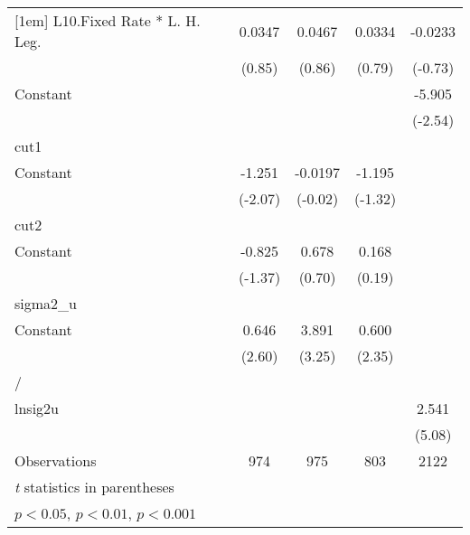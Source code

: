 {\begin{longtable}{l*{4}{c}}
[1em]
L10.Fixed Rate * L. H. Leg.&   0.0347         &   0.0467         &   0.0334         &  -0.0233         \\
                &   (0.85)         &   (0.86)         &   (0.79)         &  (-0.73)         \\
[1em]
Constant        &                  &                  &                  &   -5.905\sym{*}  \\
                &                  &                  &                  &  (-2.54)         \\
\hline
cut1            &                  &                  &                  &                  \\
Constant        &   -1.251\sym{*}  &  -0.0197         &   -1.195         &                  \\
                &  (-2.07)         &  (-0.02)         &  (-1.32)         &                  \\
\hline
cut2            &                  &                  &                  &                  \\
Constant        &   -0.825         &    0.678         &    0.168         &                  \\
                &  (-1.37)         &   (0.70)         &   (0.19)         &                  \\
\hline
sigma2\_u        &                  &                  &                  &                  \\
Constant        &    0.646\sym{**} &    3.891\sym{**} &    0.600\sym{*}  &                  \\
                &   (2.60)         &   (3.25)         &   (2.35)         &                  \\
\hline
/               &                  &                  &                  &                  \\
lnsig2u         &                  &                  &                  &    2.541\sym{***}\\
                &                  &                  &                  &   (5.08)         \\
\hline
Observations    &      974         &      975         &      803         &     2122         \\
\hline\hline
\multicolumn{5}{l}{\footnotesize \textit{t} statistics in parentheses}\\
\multicolumn{5}{l}{\footnotesize \sym{*} \(p<0.05\), \sym{**} \(p<0.01\), \sym{***} \(p<0.001\)}\\
\end{longtable}
}
